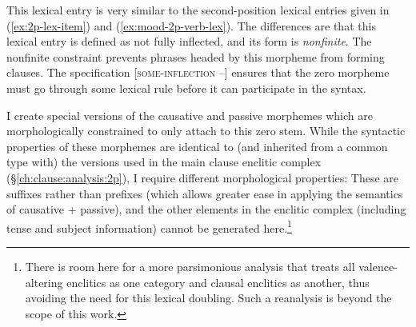 \begin{singlespacing}
\ex \label{ex:svc-zero-morpheme}
\xe
\end{singlespacing}

This lexical entry is very similar to the second-position lexical entries given in (\ref{ex:2p-lex-item}) and (\ref{ex:mood-2p-verb-lex}). The differences are that this lexical entry is defined as not fully inflected, and its form is \textit{nonfinite}. The nonfinite constraint prevents phrases headed by this morpheme from forming clauses. The specification [\textsc{some-inflection} --] ensures that the zero morpheme must go through some lexical rule before it can participate in the syntax.

I create special versions of the causative and passive morphemes which are morphologically constrained to only attach to this zero stem. While the syntactic properties of these morphemes are identical to (and inherited from a common type with) the versions used in the main clause enclitic complex (\S\ref{ch:clause:analysis:2p}), I require different morphological properties: These are suffixes rather than prefixes (which allows greater ease in applying the semantics of causative + passive), and the other elements in the enclitic complex (including tense and subject information) cannot be generated here.\footnote{There is room here for a more parsimonious analysis that treats all valence-altering enclitics as one category and clausal enclitics as another, thus avoiding the need for this lexical doubling. Such a reanalysis is beyond the scope of this work.}

